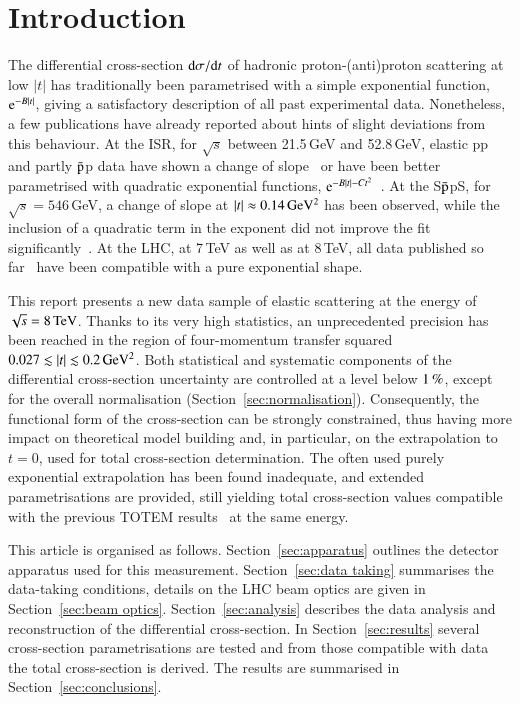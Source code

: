 \section{Introduction}
%
The differential cross-section ${\rm d} \sigma/{\rm d} t$ of hadronic proton-(anti)proton 
scattering at low $|t|$ has traditionally been parametrised with a simple 
exponential function, ${\rm e}^{-B |t|}$, giving a satisfactory description of 
all past experimental data.
Nonetheless, a few publications have already reported about hints of
slight deviations from this behaviour. At the ISR, for $\sqrt{s}$ 
between 21.5\,GeV and 52.8\,GeV, elastic pp and partly $\rm\bar{p}$p data have shown a 
change of slope~\cite{plb39,plb115} or have been better parametrised with quadratic 
exponential functions, ${\rm e}^{-B |t|-C t^2}$~\cite{npb141,npb248}. 
At the S$\rm\bar{p}$pS, for 
$\sqrt{s} = 546\,$GeV, a change of slope at $|t| \approx 0.14\,\rm GeV^{2}$ 
has been observed, while the inclusion of a quadratic term in the exponent did
not improve the fit significantly~\cite{plb147}.
At the LHC, at 7\,TeV as well as at 8\,TeV, all data published so 
far~\cite{epl96,epl101-el,prl111,alfa} have been
compatible with a pure exponential shape.

This report presents a new data sample of elastic scattering at the energy of $\sqrt s = 8\,{\rm TeV}$. Thanks to its very high statistics,
an unprecedented precision has been reached in the region of four-momentum transfer squared $0.027 \lesssim |t| \lesssim 0.2\,{\rm GeV^2}$. Both statistical and systematic components of the differential cross-section uncertainty are controlled 
at a level below $1\,{\rm \%}$, except for the overall normalisation 
(Section~\ref{sec:normalisation}). Consequently, the functional form of the cross-section can be strongly constrained, thus having more impact on theoretical model building and, in particular, on the extrapolation to $t=0$, used for total cross-section determination. The often used purely exponential extrapolation has been found inadequate, and extended parametrisations are provided, still yielding total cross-section values compatible with the previous TOTEM results~\cite{prl111} at the same energy.

This article is organised as follows. Section~\ref{sec:apparatus} outlines the detector apparatus used for this measurement. Section~\ref{sec:data taking} summarises the data-taking conditions, details on the LHC beam optics are given in Section~\ref{sec:beam optics}. Section~\ref{sec:analysis} describes the data analysis and reconstruction of the differential cross-section. In Section~\ref{sec:results} several cross-section parametrisations are tested and from those compatible with data the total cross-section is derived. The results are summarised in Section~\ref{sec:conclusions}.
